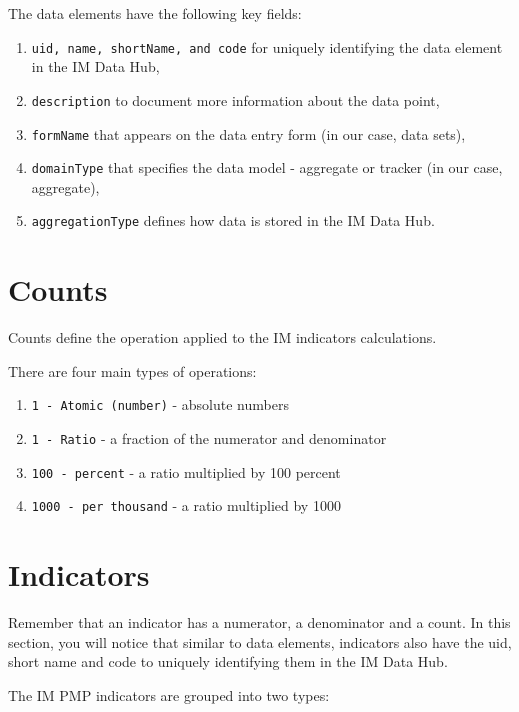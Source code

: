 \documentclass[]{book}
\providecommand{\tightlist}{%
  \setlength{\itemsep}{0pt}\setlength{\parskip}{0pt}}
\begin{document}
The data elements have the following key fields:

\begin{enumerate}
\def\labelenumi{\arabic{enumi}.}
\tightlist
\item
  \texttt{uid,\ name,\ shortName,\ and\ code} for uniquely identifying the data element in the IM Data Hub,
\item
  \texttt{description} to document more information about the data point,
\item
  \texttt{formName} that appears on the data entry form (in our case, data sets),
\item
  \texttt{domainType} that specifies the data model - aggregate or tracker (in our case, aggregate),
\item
  \texttt{aggregationType} defines how data is stored in the IM Data Hub.
\end{enumerate}

\hypertarget{counts}{%
\section{Counts}\label{counts}}

Counts define the operation applied to the IM indicators calculations.

There are four main types of operations:

\begin{enumerate}
\def\labelenumi{\arabic{enumi}.}
\tightlist
\item
  \texttt{1\ -\ Atomic\ (number)} - absolute numbers
\item
  \texttt{1\ -\ Ratio} - a fraction of the numerator and denominator
\item
  \texttt{100\ -\ percent} - a ratio multiplied by 100 percent
\item
  \texttt{1000\ -\ per\ thousand} - a ratio multiplied by 1000
\end{enumerate}

\hypertarget{ind}{%
\section{Indicators}\label{ind}}

Remember that an indicator has a numerator, a denominator and a count. In this section, you will notice that similar to data elements, indicators also have the uid, short name and code to uniquely identifying them in the IM Data Hub.

The IM PMP indicators are grouped into two types:
\end{document}
